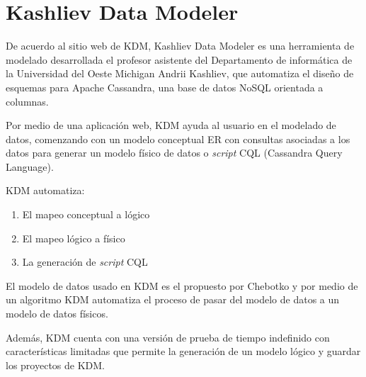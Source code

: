 \section{Kashliev Data Modeler}
De acuerdo al sitio web de KDM\cite{datafluent_kashliev_2020}, Kashliev Data Modeler es una herramienta de modelado desarrollada el profesor asistente del Departamento de informática de la Universidad del Oeste Michigan Andrii Kashliev, que automatiza el diseño de esquemas para Apache Cassandra, una base de datos NoSQL orientada a columnas. 


Por medio de una aplicación web, KDM ayuda al usuario en el modelado de datos, comenzando con un modelo conceptual ER con consultas asociadas a los datos para generar un modelo físico de datos o \textit{script} CQL (Cassandra Query Language). 


KDM automatiza: 

\begin{enumerate}
    \item El mapeo conceptual a lógico
    \item El mapeo lógico a físico
    \item La generación de \textit{script} CQL 
\end{enumerate}

El modelo de datos usado en KDM es el propuesto por Chebotko\cite{chebotko_big_2015} y por medio de un algoritmo KDM automatiza el proceso de pasar del modelo de datos a un modelo de datos físicos. 


Además, KDM cuenta con una versión de prueba de tiempo indefinido con características limitadas que permite la generación de un modelo lógico y guardar los proyectos de KDM.
